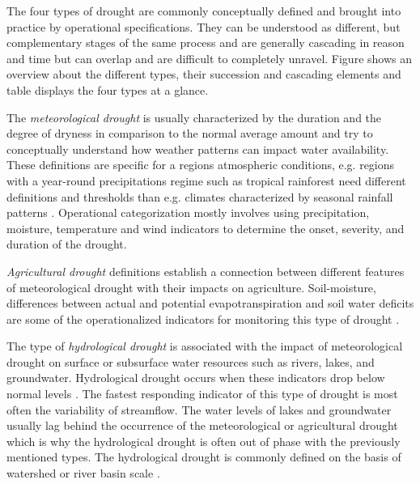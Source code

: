 {The four types of drought are commonly conceptually defined and brought into practice by operational specifications. They can be understood as different, but complementary stages of the same process and are generally cascading in reason and time but can overlap and are difficult to completely unravel. Figure  shows an overview about the different types, their succession and cascading elements and table  displays the four types at a glance.


The \textit{meteorological drought} is usually characterized by the duration and the degree of dryness in comparison to the normal average amount and try to conceptually understand how weather patterns can impact water availability. These definitions are specific for a regions atmospheric conditions, e.g. regions with a year-round precipitations regime such as tropical rainforest need different definitions and thresholds than e.g. climates characterized by seasonal rainfall patterns \autocite{nationaldroughtmitigationcenterTypesDrought}. Operational categorization mostly involves using precipitation, moisture, temperature and wind indicators to determine the onset, severity, and duration of the drought.

\textit{Agricultural drought} definitions establish a connection between different features of meteorological drought with their impacts on agriculture. Soil-moisture, differences between actual and potential evapotranspiration and soil water deficits are some of the operationalized indicators for monitoring this type of drought \autocite{baltiReviewDroughtMonitoring2020,nationaldroughtmitigationcenterTypesDrought,wilhiteUnderstandingDroughtPhenomenon1985}.

The type of \textit{hydrological drought} is associated with the impact of meteorological drought on surface or subsurface water resources such as rivers, lakes, and groundwater. Hydrological drought occurs when these indicators drop below normal levels \autocite{palmerMeteorologicalDrought1965}. The fastest responding indicator of this type of drought is most often the variability of streamflow. The water levels of lakes and groundwater usually lag behind the occurrence of the meteorological or agricultural drought which is why the hydrological drought is often out of phase with the previously mentioned types. The hydrological drought is commonly defined on the basis of watershed or river basin scale \autocite{baltiReviewDroughtMonitoring2020,nationaldroughtmitigationcenterTypesDrought,wilhiteUnderstandingDroughtPhenomenon1985}.

}
